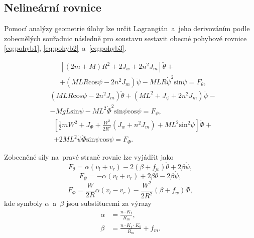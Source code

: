 \documentclass[conference]{IEEEtran}
\begin{document}
\pagebreak
\subsection{Nelineární rovnice}
Pomocí analýzy geometrie úlohy lze určit Lagrangián~a~jeho derivováním podle zobecnělých souřadnic 
následně pro soustavu sestavit obecné pohybové rovnice \eqref{eq:pohyb1}, \eqref{eq:pohyb2}~a~\eqref{eq:pohyb3}.

\begin{equation}
    \begin{aligned}
        &\left[(2m + M) R^2 + 2 J_w + 2n^2 J_m\right] \ddot{\theta} + \\
        &+ (MLR \text{cos} \psi - 2n^2 J_m) \ddot{\psi} - MLR\dot{\psi}^2 \text{sin} \psi = F_\theta,
    \end{aligned}
    \label{eq:pohyb1}
\end{equation}
\begin{equation}
    \begin{aligned}
        & (MLR \text{cos} \psi - 2n^2 J_m) \ddot{\theta} + (ML^2 + J_\psi + 2n^2 J_m) \ddot{\psi} - \\
        & - MgL\text{sin}\psi - ML^2\dot{\varPhi}^2 \text{sin} \psi \text{cos} \psi = F_\psi,
    \end{aligned}
    \label{eq:pohyb2}
\end{equation}
\begin{equation}
    \begin{aligned}
        &\left[ \frac{1}{2} mW^2  + J_\varPhi + \frac{W^2}{2R^2}\left( J_w + n^2 J_m \right) + ML^2 \text{sin}^2 \psi \right] \ddot{\varPhi} + \\
        &+ 2ML^2 \dot{\psi} \dot{\varPhi} \text{sin}\psi \text{cos} \psi = F_\varPhi.
    \end{aligned}
    \label{eq:pohyb3}
\end{equation}

Zobecněné síly na~pravé straně rovnic lze vyjádřit jako
\begin{equation}
    F_\theta = \alpha(v_l + v_r) - 2(\beta + f_w) \dot{\theta} + 2\beta\dot{\psi},
    \label{eq:motor1}
\end{equation}
\begin{equation}
    F_\psi = -\alpha(v_l + v_r) + 2\beta \dot{\theta} - 2\beta \dot{\psi},
    \label{eq:motor2}
\end{equation}
\begin{equation}
    F_\varPhi = \frac{W}{2R} \alpha (v_l - v_r) - \frac{W^2}{2R^2}(\beta + f_w) \dot{\varPhi},
    \label{eq:motor3}
\end{equation}
kde symboly $\alpha$~a~$\beta$ jsou substitucemi za výrazy
\begin{equation}
    \begin{split}
        \alpha &= \frac{n \cdot K_t} {R_m},  \\
        \beta &= \frac{n \cdot K_t \cdot K_b} {R_m} + f_m .
    \end{split}
    \label{eq:motor_substituce}
\end{equation}
\end{document}
